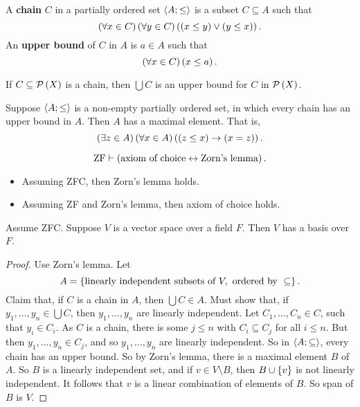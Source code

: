 A \textbf{chain} $ C $ in a partially ordered set $ \left\langle A; \le \right\rangle $ is a subset $ C \subseteq A $ such that
$$ \left( \forall x \in C \right)\left( \forall y \in C \right)\left( \left( x \le y \right) \lor \left( y \le x \right) \right). $$
An \textbf{upper bound} of $ C $ in $ A $ is $ a \in A $ such that
$$ \left( \forall x \in C \right)\left( x \le a \right). $$

\begin{example2}
If $ C \subseteq \mathcal{P}\left( X \right) $ is a chain, then $ \bigcup C $ is an upper bound for $ C $ in $ \mathcal{P}\left( X \right) $.
\end{example2}

\begin{definition}
Suppose $ \left\langle A; \le \right\rangle $ is a non-empty partially ordered set, in which every chain has an upper bound in $ A $. Then $ A $ has a maximal element. That is,
$$ \left( \exists z \in A \right)\left( \forall x \in A \right)\left( \left( z \le x \right) \rightarrow \left( x = z \right) \right). $$
\end{definition}

\begin{theorem}
\label{thm:4.3.2}
$$ \text{ZF} \vdash \left( \text{axiom of choice} \leftrightarrow \text{Zorn's lemma} \right). $$
\begin{itemize}
\item Assuming ZFC, then Zorn's lemma holds.
\item Assuming ZF and Zorn's lemma, then axiom of choice holds.
\end{itemize}
\end{theorem}

\begin{example1}
Assume ZFC. Suppose $ V $ is a vector space over a field $ F $. Then $ V $ has a basis over $ F $.
\end{example1}

\begin{proof}
Use Zorn's lemma. Let
$$ A = \cb{\text{linearly independent subsets of} \ V, \ \text{ordered by} \ \subseteq}. $$
Claim that, if $ C $ is a chain in $ A $, then $ \bigcup C \in A $. Must show that, if $ y_1, \dots, y_n \in \bigcup C $, then $ y_1, \dots, y_n $ are linearly independent. Let $ C_1, \dots, C_n \in C $, such that $ y_i \in C_i $. As $ C $ is a chain, there is some $ j \le n $ with $ C_i \subseteq C_j $ for all $ i \le n $. But then $ y_1, \dots, y_n \in C_j $, and so $ y_1, \dots, y_n $ are linearly independent. So in $ \left\langle A; \subseteq \right\rangle $, every chain has an upper bound. So by Zorn's lemma, there is a maximal element $ B $ of $ A $. So $ B $ is a linearly independent set, and if $ v \in V \setminus B $, then $ B \cup \left\{ v \right\} $ is not linearly independent. It follows that $ v $ is a linear combination of elements of $ B $. So span of $ B $ is $ V $.
\end{proof}

